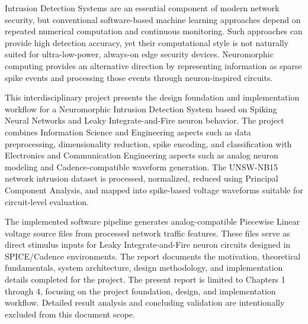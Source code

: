 \vspace{-1cm}

Intrusion Detection Systems are an essential component of modern network security, but conventional software-based machine learning approaches depend on repeated numerical computation and continuous monitoring. Such approaches can provide high detection accuracy, yet their computational style is not naturally suited for ultra-low-power, always-on edge security devices. Neuromorphic computing provides an alternative direction by representing information as sparse spike events and processing those events through neuron-inspired circuits.

This interdisciplinary project presents the design foundation and implementation workflow for a Neuromorphic Intrusion Detection System based on Spiking Neural Networks and Leaky Integrate-and-Fire neuron behavior. The project combines Information Science and Engineering aspects such as data preprocessing, dimensionality reduction, spike encoding, and classification with Electronics and Communication Engineering aspects such as analog neuron modeling and Cadence-compatible waveform generation. The UNSW-NB15 network intrusion dataset is processed, normalized, reduced using Principal Component Analysis, and mapped into spike-based voltage waveforms suitable for circuit-level evaluation.

The implemented software pipeline generates analog-compatible Piecewise Linear voltage source files from processed network traffic features. These files serve as direct stimulus inputs for Leaky Integrate-and-Fire neuron circuits designed in SPICE/Cadence environments. The report documents the motivation, theoretical fundamentals, system architecture, design methodology, and implementation details completed for the project. The present report is limited to Chapters 1 through 4, focusing on the project foundation, design, and implementation workflow. Detailed result analysis and concluding validation are intentionally excluded from this document scope.

\pagebreak
